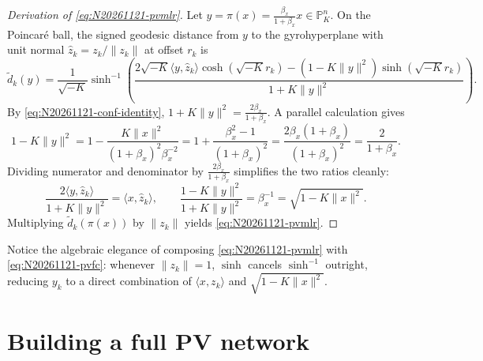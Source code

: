 \begin{proof}[Derivation of \eqref{eq:N20261121-pvmlr}]
Let \(y = \pi(x) = \frac{\beta_x}{1+\beta_x}x \in \mathbb{P}_K^n\). On the Poincar\'e ball, the signed geodesic distance from \(y\) to the gyrohyperplane with unit normal \(\hat{z}_k=z_k/\|z_k\|\) at offset \(r_k\) is
\[
  \tilde{d}_k(y) = \frac{1}{\sqrt{-K}}\sinh^{-1}\!\left(\frac{2\sqrt{-K}\langle y,\hat{z}_k\rangle\cosh(\sqrt{-K}r_k) - (1-K\|y\|^2)\sinh(\sqrt{-K}r_k)}{1+K\|y\|^2}\right).
\]
By \eqref{eq:N20261121-conf-identity}, \(1+K\|y\|^2 = \frac{2\beta_x}{1+\beta_x}\). A parallel calculation gives
\[
  1 - K\|y\|^2
  = 1 - \frac{K\|x\|^2}{(1+\beta_x)^2\beta_x^{-2}}
  = 1 + \frac{\beta_x^2-1}{(1+\beta_x)^2}
  = \frac{2\beta_x(1+\beta_x)}{(1+\beta_x)^2}
  = \frac{2}{1+\beta_x}.
\]
Dividing numerator and denominator by \(\frac{2\beta_x}{1+\beta_x}\) simplifies the two ratios cleanly:
\[
  \frac{2\langle y,\hat{z}_k\rangle}{1+K\|y\|^2} = \langle x,\hat{z}_k\rangle,
  \qquad
  \frac{1-K\|y\|^2}{1+K\|y\|^2} = \beta_x^{-1} = \sqrt{1-K\|x\|^2}.
\]
Multiplying \(\tilde{d}_k(\pi(x))\) by \(\|z_k\|\) yields \eqref{eq:N20261121-pvmlr}.
\end{proof}

Notice the algebraic elegance of composing \eqref{eq:N20261121-pvmlr} with \eqref{eq:N20261121-pvfc}: whenever \(\|z_k\|=1\), \(\sinh\) cancels \(\sinh^{-1}\) outright, reducing \(y_k\) to a direct combination of \(\langle x,z_k\rangle\) and \(\sqrt{1-K\|x\|^2}\).

\section{Building a full PV network}

